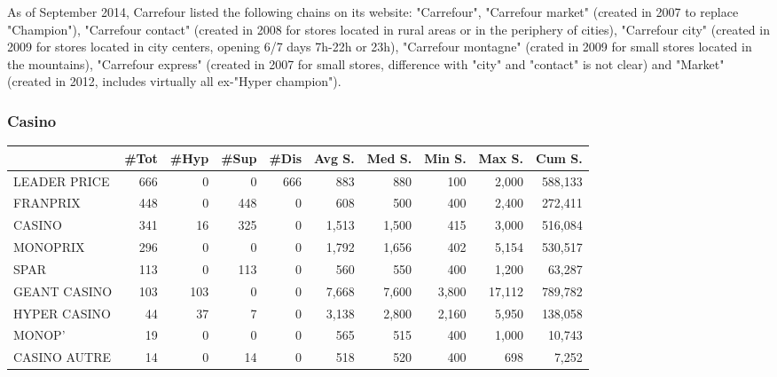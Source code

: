 \documentclass[11pt]{article}
\begin{document}
As of September 2014, Carrefour listed the following chains on its website: "Carrefour", "Carrefour market" (created in 2007 to replace "Champion"), "Carrefour contact" (created in 2008 for stores located in rural areas or in the periphery of cities), "Carrefour city" (created in 2009 for stores located in city centers, opening 6/7 days 7h-22h or 23h), "Carrefour montagne" (crated in 2009 for small stores located in the mountains), "Carrefour express" (created in 2007 for small stores, difference with "city" and "contact" is not clear) and "Market" (created in 2012, includes virtually all ex-"Hyper champion").

\subsubsection{Casino}

\begin{table}[H]
\footnotesize
\setlength{\tabcolsep}{2pt}

\begin{tabular}{lrrrrrrrrr}
\toprule
{} &       \#Tot &       \#Hyp &       \#Sup &       \#Dis &     Avg S. &     Med S. &     Min S. &     Max S. &     Cum S. \\
\midrule
LEADER PRICE &        666 &          0 &          0 &        666 &        883 &        880 &        100 &      2,000 &    588,133 \\
FRANPRIX     &        448 &          0 &        448 &          0 &        608 &        500 &        400 &      2,400 &    272,411 \\
CASINO       &        341 &         16 &        325 &          0 &      1,513 &      1,500 &        415 &      3,000 &    516,084 \\
MONOPRIX     &        296 &          0 &          0 &          0 &      1,792 &      1,656 &        402 &      5,154 &    530,517 \\
SPAR         &        113 &          0 &        113 &          0 &        560 &        550 &        400 &      1,200 &     63,287 \\
GEANT CASINO &        103 &        103 &          0 &          0 &      7,668 &      7,600 &      3,800 &     17,112 &    789,782 \\
HYPER CASINO &         44 &         37 &          7 &          0 &      3,138 &      2,800 &      2,160 &      5,950 &    138,058 \\
MONOP'       &         19 &          0 &          0 &          0 &        565 &        515 &        400 &      1,000 &     10,743 \\
CASINO AUTRE &         14 &          0 &         14 &          0 &        518 &        520 &        400 &        698 &      7,252 \\
\bottomrule
\end{tabular}

\end{table}
\end{document}
